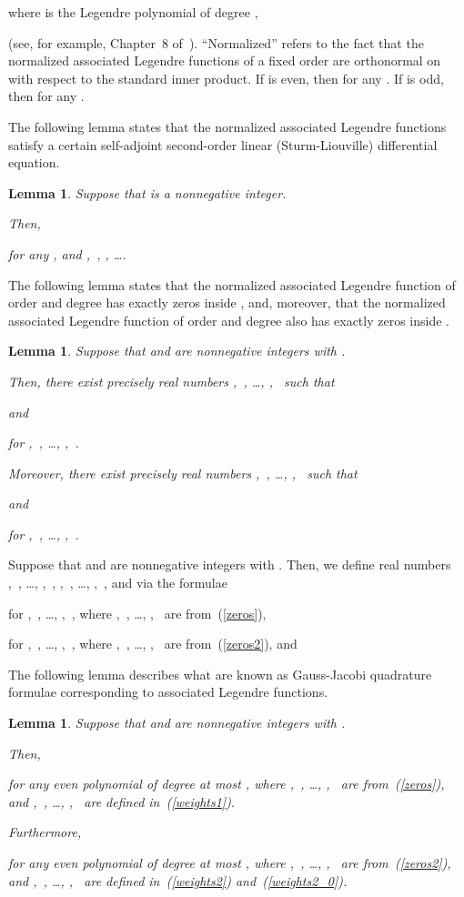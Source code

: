 \documentclass[final,3p,times]{elsarticle}
\newtheorem{lemma1}[theorem]{Lemma}
\newenvironment{lemma}{\begin{lemma1}}{\end{lemma1}}
\begin{document}
where  is the Legendre polynomial of degree ,

(see, for example, Chapter~8 of~\cite{abramowitz-stegun}).
``Normalized'' refers to the fact that
the normalized associated Legendre functions
of a fixed order  are orthonormal on 
with respect to the standard inner product.
If  is even, then 
for any .
If  is odd, then 
for any .


The following lemma states that the normalized associated Legendre functions
satisfy a certain self-adjoint second-order linear (Sturm-Liouville)
differential equation.

\begin{lemma}
Suppose that  is a nonnegative integer.

Then,

for any , and ,~, , \dots.
\end{lemma}


The following lemma states that the normalized associated Legendre function
of order  and degree  has exactly  zeros inside ,
and, moreover, that the normalized associated Legendre function
of order  and degree  also has exactly  zeros inside .

\begin{lemma}
\label{distinct_theorem}
Suppose that  and  are nonnegative integers with .

Then, there exist precisely  real numbers
,~, \dots, ,~ such that

and

for ,~, \dots, ,~.

Moreover, there exist precisely  real numbers
,~, \dots, ,~ such that

and

for ,~, \dots, ,~.
\end{lemma}


Suppose that  and  are nonnegative integers with .
Then, we define real numbers
,~, \dots, ,~,
,~, \dots, ,~,
and  via the formulae

for ,~, \dots, ,~,
where ,~, \dots, ,~ are from~(\ref{zeros}),

for ,~, \dots, ,~,
where ,~, \dots, ,~ are from~(\ref{zeros2}), and


The following lemma describes what are known as Gauss-Jacobi quad\-rature
formulae corresponding to associated Legendre functions.

\begin{lemma}
\label{quadratures}
Suppose that  and  are nonnegative integers with .

Then,

for any even polynomial  of degree at most ,
where ,~, \dots, ,~ are from~(\ref{zeros}),
and ,~, \dots, ,~
are defined in~(\ref{weights1}).

Furthermore,

for any even polynomial  of degree at most ,
where ,~, \dots, ,~ are from~(\ref{zeros2}),
and ,~, \dots, ,~
are defined in~(\ref{weights2}) and~(\ref{weights2_0}).
\end{lemma}
\end{document}
